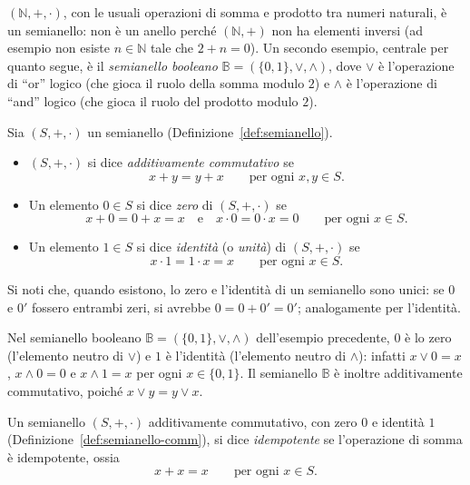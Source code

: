 \begin{rema}
$(\mathbb{N},+,\cdot)$, con le usuali operazioni di somma e prodotto tra numeri naturali, è un semianello: non è un anello perché $(\mathbb{N},+)$ non ha elementi inversi (ad esempio non esiste $n\in\mathbb{N}$ tale che $2+n=0$).
Un secondo esempio, centrale per quanto segue, è il \emph{semianello booleano} $\mathbb{B}=(\{0,1\},\vee,\wedge)$, dove $\vee$ è l'operazione di ``or'' logico (che gioca il ruolo della somma modulo $2$) e $\wedge$ è l'operazione di ``and'' logico (che gioca il ruolo del prodotto modulo $2$).
\end{rema}

\begin{defi}\label{def:semianello-comm}
Sia $(S,+,\cdot)$ un semianello (Definizione~\ref{def:semianello}).
\begin{itemize}
    \item $(S,+,\cdot)$ si dice \emph{additivamente commutativo} se
    \[x+y=y+x \qquad \text{per ogni } x,y\in S.\]
    \item Un elemento $0\in S$ si dice \emph{zero} di $(S,+,\cdot)$ se
    \[x+0=0+x=x \quad \text{e} \quad x\cdot 0 = 0\cdot x = 0 \qquad \text{per ogni } x\in S.\]
    \item Un elemento $1\in S$ si dice \emph{identità} (o \emph{unità}) di $(S,+,\cdot)$ se
    \[x\cdot 1 = 1\cdot x = x \qquad \text{per ogni } x\in S.\]
\end{itemize}
Si noti che, quando esistono, lo zero e l'identità di un semianello sono unici: se $0$ e $0'$ fossero entrambi zeri, si avrebbe $0=0+0'=0'$; analogamente per l'identità.
\end{defi}

\begin{rema}
Nel semianello booleano $\mathbb{B}=(\{0,1\},\vee,\wedge)$ dell'esempio precedente, $0$ è lo zero (l'elemento neutro di $\vee$) e $1$ è l'identità (l'elemento neutro di $\wedge$): infatti $x\vee 0 = x$, $x\wedge 0 = 0$ e $x\wedge 1 = x$ per ogni $x\in\{0,1\}$. Il semianello $\mathbb{B}$ è inoltre additivamente commutativo, poiché $x\vee y = y\vee x$.
\end{rema}

\begin{defi}\label{def:semianello-idem}
Un semianello $(S,+,\cdot)$ additivamente commutativo, con zero $0$ e identità $1$ (Definizione~\ref{def:semianello-comm}), si dice \emph{idempotente} se l'operazione di somma è idempotente, ossia
\[x+x=x \qquad \text{per ogni } x\in S.\]
\end{defi}

